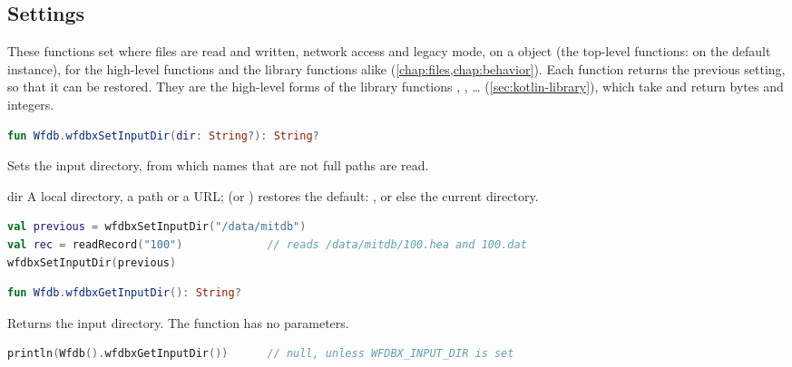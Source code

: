 \subsection{Settings}
\label{sec:kotlin-settings}

These functions set where files are read and written, network access and legacy mode, on
a  object (the top-level functions: on the default instance), for the
high-level functions and the library functions alike (\cref{chap:files,chap:behavior}).
Each  function returns the previous setting, so that it can be restored. They
are the high-level forms of the library functions ,
, \ldots{} (\cref{sec:kotlin-library}), which take and return
bytes and integers.

\begin{lstlisting}[language=Kotlin,style=signature]
fun Wfdb.wfdbxSetInputDir(dir: String?): String?
\end{lstlisting}
Sets the input directory, from which names that are not full paths are read.
\begin{params}
\item[dir] A local directory, a \code{\textasciitilde} path or a URL;  (or
  ) restores the default: , or else the current directory.
\end{params}
\begin{lstlisting}[language=Kotlin]
val previous = wfdbxSetInputDir("/data/mitdb")
val rec = readRecord("100")             // reads /data/mitdb/100.hea and 100.dat
wfdbxSetInputDir(previous)
\end{lstlisting}

\begin{lstlisting}[language=Kotlin,style=signature]
fun Wfdb.wfdbxGetInputDir(): String?
\end{lstlisting}
Returns the input directory. The function has no parameters.
\begin{lstlisting}[language=Kotlin]
println(Wfdb().wfdbxGetInputDir())      // null, unless WFDBX_INPUT_DIR is set
\end{lstlisting}

